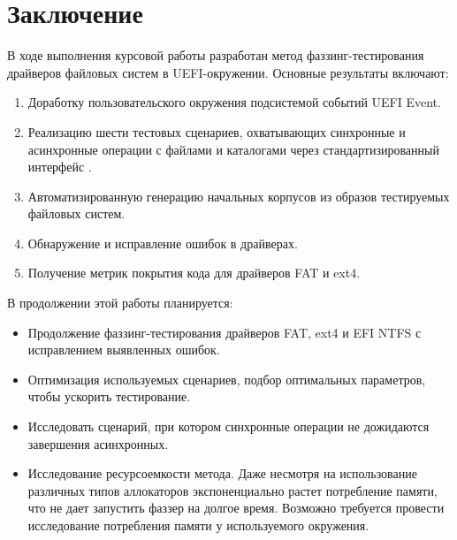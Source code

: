 \section{Заключение}
В ходе выполнения курсовой работы разработан метод фаззинг-тестирования драйверов файловых систем в UEFI-окружении. Основные результаты включают:
\begin{enumerate}
	\item Доработку пользовательского окружения подсистемой событий UEFI Event.
	\item Реализацию шести тестовых сценариев, охватывающих синхронные и асинхронные операции с файлами и каталогами через стандартизированный интерфейс .
	\item Автоматизированную генерацию начальных корпусов из образов тестируемых файловых систем.
	\item Обнаружение и исправление ошибок в драйверах.
	\item Получение метрик покрытия кода для драйверов FAT и ext4.
\end{enumerate}

В продолжении этой работы планируется:
\begin{itemize}
	\item Продолжение фаззинг-тестирования драйверов FAT, ext4 и EFI NTFS с исправлением выявленных ошибок.
	\item Оптимизация используемых сценариев, подбор оптимальных параметров, чтобы ускорить тестирование.
	\item Исследовать сценарий, при котором синхронные операции не дожидаются завершения асинхронных.
	\item Исследование ресурсоемкости метода. Даже несмотря на использование различных типов аллокаторов экспоненциально растет потребление памяти, что не дает запустить фаззер на долгое время. Возможно требуется провести исследование потребления памяти у используемого окружения.
\end{itemize} 